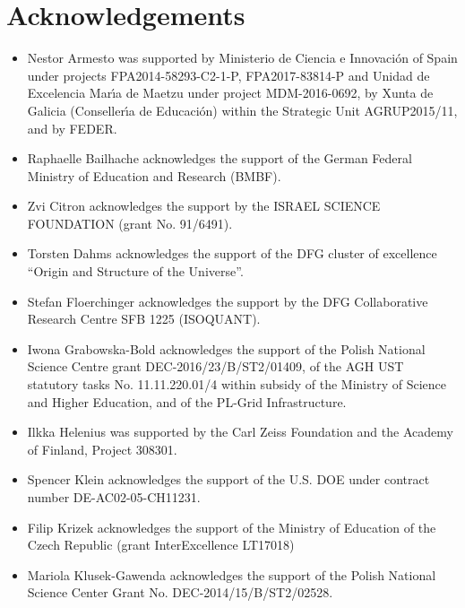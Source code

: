 \section*{Acknowledgements}


\begin{itemize}

\item Nestor Armesto was supported by Ministerio de Ciencia e Innovaci\'on of Spain under projects FPA2014-58293-C2-1-P, FPA2017-83814-P and Unidad de Excelencia Mar\'{\i}a de Maetzu under project MDM-2016-0692, by Xunta de Galicia (Conseller\'{\i}a de Educaci\'on) within the Strategic Unit AGRUP2015/11, and by FEDER. %
\item Raphaelle Bailhache acknowledges the support of the German Federal Ministry of Education and Research (BMBF).%
\item Zvi Citron acknowledges the support by the ISRAEL SCIENCE FOUNDATION (grant No. 91/6491).%
\item Torsten Dahms acknowledges the support of the DFG cluster of excellence ``Origin and Structure of the Universe''.%
\item Stefan Floerchinger acknowledges the support by the DFG Collaborative Research Centre SFB 1225 (ISOQUANT).  %
\item Iwona Grabowska-Bold acknowledges the support of the Polish National Science Centre grant DEC-2016/23/B/ST2/01409, of the AGH UST statutory tasks No. 11.11.220.01/4 within subsidy of the Ministry of Science and Higher Education, and of the PL-Grid Infrastructure.%
\item Ilkka Helenius was supported by the Carl Zeiss Foundation and the Academy of Finland, Project 308301.%
\item Spencer Klein acknowledges the support of the U.S. DOE under contract number DE-AC02-05-CH11231.%
\item Filip Krizek acknowledges the support of the Ministry of Education of the Czech Republic (grant InterExcellence LT17018) %
\item Mariola Klusek-Gawenda acknowledges the support of the Polish National Science Center Grant No. DEC-2014/15/B/ST2/02528.%

\end{itemize}
